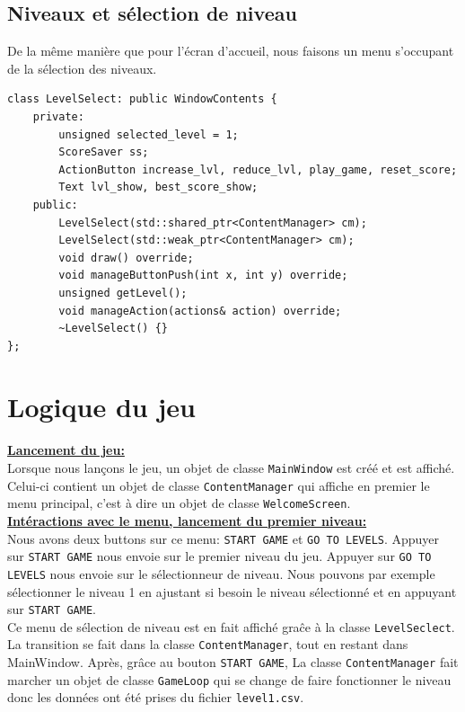 \documentclass[a4paper, 12pt]{article}
\begin{document}
\subsection{Niveaux et sélection de niveau}

De la même manière que pour l'écran d'accueil, 
nous faisons un menu s'occupant de la sélection des niveaux.
\begin{lstlisting}
class LevelSelect: public WindowContents {
    private:
        unsigned selected_level = 1;
        ScoreSaver ss;
        ActionButton increase_lvl, reduce_lvl, play_game, reset_score;
        Text lvl_show, best_score_show;    
    public:
        LevelSelect(std::shared_ptr<ContentManager> cm);
        LevelSelect(std::weak_ptr<ContentManager> cm);
        void draw() override;
        void manageButtonPush(int x, int y) override;
        unsigned getLevel();
        void manageAction(actions& action) override;
        ~LevelSelect() {}
};
\end{lstlisting}

\pagebreak

\section{Logique du jeu}

\underline{\textbf{Lancement du jeu:}}  \vspace{0.1cm}\\
Lorsque nous lançons le jeu, un objet de classe \texttt{MainWindow} est créé 
et est affiché. 
Celui-ci contient un objet de classe \texttt{ContentManager} qui affiche en premier le
menu principal, c'est à dire un objet de classe \texttt{WelcomeScreen}. \\

\underline{\textbf{Intéractions avec le menu, lancement du premier niveau:}} \vspace{0.1cm} \\
Nous avons deux buttons sur ce menu: \texttt{START GAME} et \texttt{GO TO LEVELS}. 
Appuyer sur \texttt{START GAME} nous envoie sur le premier niveau du jeu.
Appuyer sur \texttt{GO TO LEVELS} nous envoie sur le sélectionneur de niveau.
Nous pouvons par exemple sélectionner le niveau 1 en ajustant si besoin le 
niveau sélectionné et en appuyant sur \texttt{START GAME}. \\
Ce menu de sélection de niveau est en fait affiché graĉe à la classe 
\texttt{LevelSeclect}.
La transition se fait dans la classe \texttt{ContentManager}, 
tout en restant dans MainWindow.
Après, grâce au bouton \texttt{START GAME},
La classe \texttt{ContentManager} fait marcher un objet de classe \texttt{GameLoop}
qui se change de faire fonctionner le niveau donc les données ont été prises du
fichier \texttt{level1.csv}. \\
\end{document}
